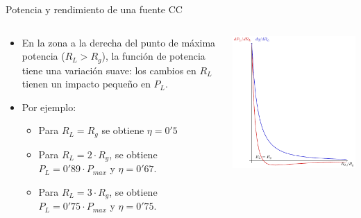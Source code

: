 \documentclass[aspectratio=169, usenames,svgnames,dvipsnames]{beamer}
\begin{document}
\begin{frame}[label={sec:org3c7047c}]{Potencia y rendimiento de una fuente CC}
\begin{columns}
\begin{column}{0.5\columnwidth}
\begin{itemize}
\item En la zona a la derecha del punto de máxima potencia (\(R_L > R_g\)), la función de potencia tiene una variación suave: los cambios en \(R_L\) tienen un impacto pequeño en \(P_L\).
\item Por ejemplo:
\begin{itemize}
\item Para \(R_L = R_g\) se obtiene \(\eta = 0'5\)
\item Para \(R_L = 2\cdot R_g\), se obtiene \(P_L = 0'89 \cdot P_{max}\) y \(\eta = 0'67\).
\item Para \(R_L = 3\cdot R_g\), se obtiene \(P_L = 0'75 \cdot P_{max}\) y \(\eta = 0'75\).
\end{itemize}
\end{itemize}
\end{column}
\begin{column}{0.5\columnwidth}
\begin{center}
\includegraphics[height=0.85\textheight]{../figs/FuenteReal_DifPotencia.pdf}
\end{center}
\end{column}
\end{columns}
\end{frame}
\end{document}
